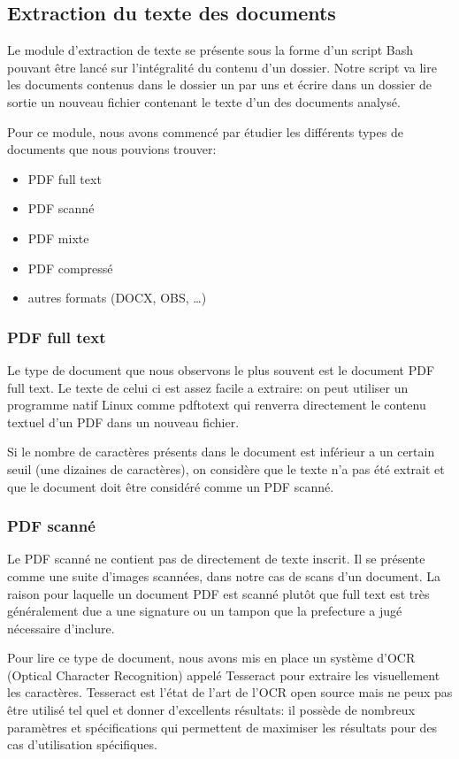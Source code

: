 
\subsection{Extraction du texte des documents}
Le module d'extraction de texte se présente sous la forme d'un script Bash pouvant être lancé sur l'intégralité du contenu d'un dossier.
Notre script va lire les documents contenus dans le dossier un par uns et écrire dans un dossier de sortie un nouveau fichier contenant le texte d'un des documents analysé.

Pour ce module, nous avons commencé par étudier les différents types de documents que nous pouvions trouver:
\begin{itemize}
\item PDF full text
\item PDF scanné
\item PDF mixte
\item PDF compressé
\item autres formats (DOCX, OBS, \ldots)
\end{itemize}

\subsubsection{PDF full text}
Le type de document que nous observons le plus souvent est le document PDF full text.
Le texte de celui ci est assez facile a extraire: on peut utiliser un programme natif Linux comme pdftotext qui renverra directement le contenu textuel d'un PDF dans un nouveau fichier.

Si le nombre de caractères présents dans le document est inférieur a un certain seuil (une dizaines de caractères), on considère que le texte n'a pas été extrait et que le document doit être considéré comme un PDF scanné.

\subsubsection{PDF scanné}
Le PDF scanné ne contient pas de directement de texte inscrit.
Il se présente comme une suite d'images scannées, dans notre cas de scans d'un document.
La raison pour laquelle un document PDF est scanné plutôt que full text est très généralement due a une signature ou un tampon que la prefecture a jugé nécessaire d'inclure.

Pour lire ce type de document, nous avons mis en place un système d'OCR (Optical Character Recognition) appelé Tesseract pour extraire les visuellement les caractères.
Tesseract est l'état de l'art de l'OCR open source mais ne peux pas être utilisé tel quel et donner d'excellents résultats: il possède de nombreux paramètres et spécifications qui permettent de maximiser les résultats pour des cas d'utilisation spécifiques.


